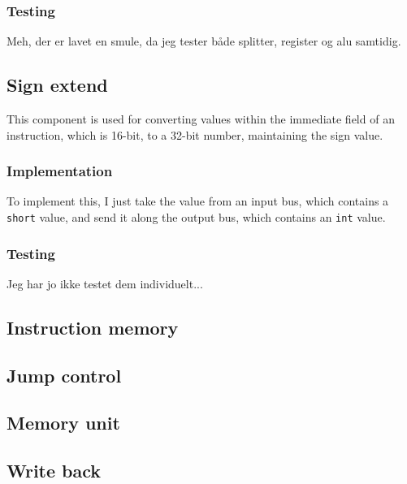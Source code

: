 \subsubsection*{Testing}
Meh, der er lavet en smule, da jeg tester både splitter, register og alu
samtidig.

\subsection{Sign extend}
This component is used for converting values within the immediate field of an
instruction, which is 16-bit, to a 32-bit number, maintaining the sign value.

\subsubsection*{Implementation}
To implement this, I just take the value from an input bus, which contains a
\texttt{short} value, and send it along the output bus, which contains an
\texttt{int} value.

\subsubsection*{Testing}
Jeg har jo ikke testet dem individuelt...

\subsection{Instruction memory}
\subsection{Jump control}
\subsection{Memory unit}
\subsection{Write back}
